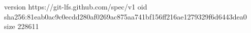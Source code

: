 version https://git-lfs.github.com/spec/v1
oid sha256:81eab0ac9c0ecdd280af0269ac875aa741bf156ff216ae1279329f6d6443dea0
size 228611
